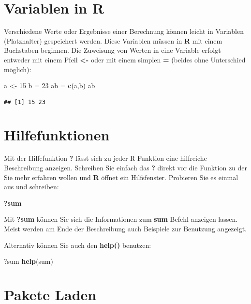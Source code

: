 \documentclass[]{book}
\newenvironment{Shaded}{\begin{snugshade}}{\end{snugshade}}
\newcommand{\KeywordTok}[1]{\textcolor[rgb]{0.13,0.29,0.53}{\textbf{#1}}}
\newcommand{\DecValTok}[1]{\textcolor[rgb]{0.00,0.00,0.81}{#1}}
\newcommand{\StringTok}[1]{\textcolor[rgb]{0.31,0.60,0.02}{#1}}
\newcommand{\NormalTok}[1]{#1}
\begin{document}
\section{Variablen in R}\label{variablen-in-r}

Verschiedene Werte oder Ergebnisse einer Berechnung können leicht in
Variablen (Platzhalter) gespeichert werden. Diese Variablen müssen in
\textbf{R} mit einem Buchstaben beginnen. Die Zuweisung von Werten in
eine Variable erfolgt entweder mit einem Pfeil \textbf{\textless{}-}
oder mit einem simplen \textbf{=} (beides ohne Unterschied möglich):

\begin{Shaded}
\begin{Highlighting}[]
\NormalTok{a <-}\StringTok{ }\DecValTok{15}
\NormalTok{b =}\StringTok{ }\DecValTok{23}
\NormalTok{ab =}\StringTok{ }\KeywordTok{c}\NormalTok{(a,b)}
\NormalTok{ab}
\end{Highlighting}
\end{Shaded}

\begin{verbatim}
## [1] 15 23
\end{verbatim}

\section{Hilfefunktionen}\label{hilfefunktionen}

Mit der Hilfefunktion \textbf{?} lässt sich zu jeder R-Funktion eine
hilfreiche Beschreibung anzeigen. Schreiben Sie einfach das \textbf{?}
direkt vor die Funktion zu der Sie mehr erfahren wollen und \textbf{R}
öffnet ein Hilfsfenster. Probieren Sie es einmal aus und schreiben:

\textbf{?sum}

Mit \textbf{?sum} können Sie sich die Informationen zum \textbf{sum}
Befehl anzeigen lassen. Meist werden am Ende der Beschreibung auch
Beispiele zur Benutzung angezeigt.

Alternativ können Sie auch den \textbf{help()} benutzen:

\begin{Shaded}
\begin{Highlighting}[]
\NormalTok{?sum}
\KeywordTok{help}\NormalTok{(sum)}
\end{Highlighting}
\end{Shaded}

\section{Pakete Laden}\label{pakete-laden}
\end{document}
